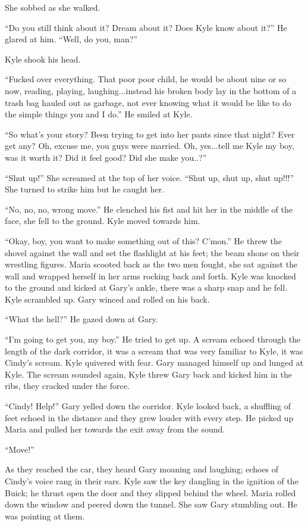 \documentclass[
]{article}
\begin{document}
She sobbed as she walked.

``Do you still think about it? Dream about it? Does Kyle know about
it?'' He glared at him. ``Well, do you, man?''

Kyle shook his head.

``Fucked over everything. That poor poor child, he would be about nine
or so now, reading, playing, laughing...instead his broken body lay in
the bottom of a trash bag hauled out as garbage, not ever knowing what
it would be like to do the simple things you and I do.'' He smiled at
Kyle.

``So what's your story? Been trying to get into her pants since that
night? Ever get any? Oh, excuse me, you guys were married. Oh,
yes...tell me Kyle my boy, was it worth it? Did it feel good? Did she
make you..?''

``Shut up!'' She screamed at the top of her voice. ``Shut up, shut up,
shut up!!!'' She turned to strike him but he caught her.

``No, no, no, wrong move.'' He clenched his fist and hit her in the
middle of the face, she fell to the ground. Kyle moved towards him.

``Okay, boy, you want to make something out of this? C'mon.'' He threw
the shovel against the wall and set the flashlight at his feet; the beam
shone on their wrestling figures. Maria scooted back as the two men
fought, she sat against the wall and wrapped herself in her arms rocking
back and forth. Kyle was knocked to the ground and kicked at Gary's
ankle, there was a sharp snap and he fell. Kyle scrambled up. Gary
winced and rolled on his back.

``What the hell?'' He gazed down at Gary.

``I'm going to get you, my boy.'' He tried to get up. A scream echoed
through the length of the dark corridor, it was a scream that was very
familiar to Kyle, it was Cindy's scream. Kyle quivered with fear. Gary
managed himself up and lunged at Kyle. The scream sounded again, Kyle
threw Gary back and kicked him in the ribs, they cracked under the
force.

``Cindy! Help!'' Gary yelled down the corridor. Kyle looked back, a
shuffling of feet echoed in the distance and they grew louder with every
step. He picked up Maria and pulled her towards the exit away from the
sound.

``Move!''

As they reached the car, they heard Gary moaning and laughing; echoes of
Cindy's voice rang in their ears. Kyle saw the key dangling in the
ignition of the Buick; he thrust open the door and they slipped behind
the wheel. Maria rolled down the window and peered down the tunnel. She
saw Gary stumbling out. He was pointing at them.
\end{document}
